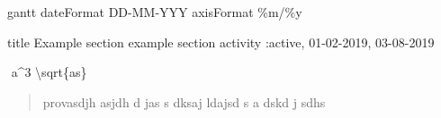 \documentclass[
]{article}
\newenvironment{Shaded}{}{}
\newcommand{\NormalTok}[1]{#1}
\newcommand{\SpecialCharTok}[1]{\textcolor[rgb]{0.25,0.44,0.63}{#1}}
\newcommand{\SpecialStringTok}[1]{\textcolor[rgb]{0.73,0.40,0.53}{#1}}
\begin{document}
\begin{Shaded}
\begin{Highlighting}[]
\NormalTok{gantt}
\NormalTok{    dateFormat DD{-}MM{-}YYY}
\NormalTok{    axisFormat \%m/\%y}

\NormalTok{    title Example}
\NormalTok{    section example section}
\NormalTok{    activity :active, 01{-}02{-}2019, 03{-}08{-}2019}
\end{Highlighting}
\end{Shaded}

\begin{Shaded}
\begin{Highlighting}[]
\SpecialStringTok{$$ a\^{}3 }\SpecialCharTok{\textbackslash{}sqrt}\SpecialStringTok{\{as\} $$}
\end{Highlighting}
\end{Shaded}

\begin{quote}
provasdjh asjdh d jas s dksaj ldajsd s a dskd j sdhs
\end{quote}
\end{document}
